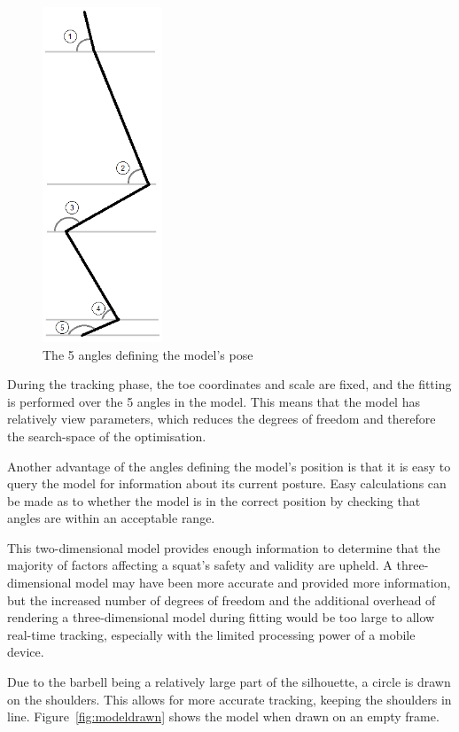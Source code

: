 \begin{figure}[H]
    \centering
	\includegraphics[height=10cm]{algorithm/images/model_angles}
\caption{The 5 angles defining the model's pose}
\label{fig:modelangles}
\end{figure}

During the tracking phase, the toe coordinates and scale are fixed, and the fitting is performed over the 5 angles in the model. This means that the model has relatively view parameters, which reduces the degrees of freedom and therefore the search-space of the optimisation.

Another advantage of the angles defining the model's position is that it is easy to query the model for information about its current posture. Easy calculations can be made as to whether the model is in the correct position by checking that angles are within an acceptable range.

This two-dimensional model provides enough information to determine that the majority of factors affecting a squat's safety and validity are upheld. A three-dimensional model may have been more accurate and provided more information, but the increased number of degrees of freedom and the additional overhead of rendering a three-dimensional model during fitting would be too large to allow real-time tracking, especially with the limited processing power of a mobile device.

Due to the barbell being a relatively large part of the silhouette, a circle is drawn on the shoulders. This allows for more accurate tracking, keeping the shoulders in line. Figure~\ref{fig:modeldrawn} shows the model when drawn on an empty frame.


